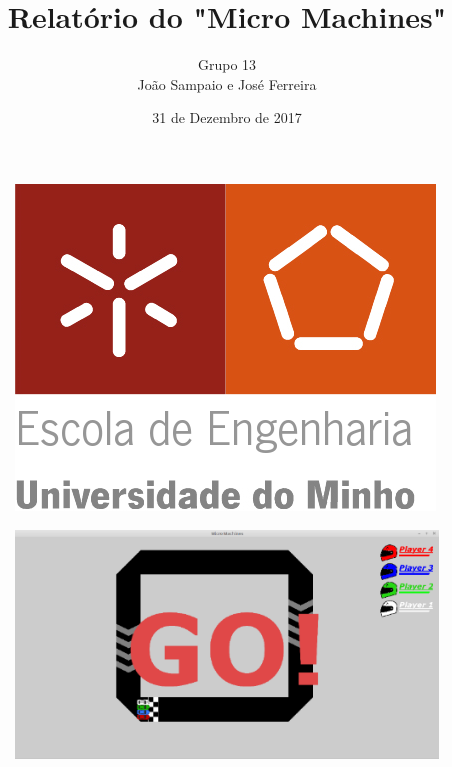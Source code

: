 \documentclass[a4paper]{report} %
\begin{document}
\begin{figure}[t]
    
    \centering
    \flushleft\includegraphics[scale = 0.2]{Imagens/um.png}

\end{figure}

\title {\huge Relatório do "Micro Machines"}
\author{Grupo 13
\\
João Sampaio e José Ferreira}

\date{31 de Dezembro de 2017}

\begin{figure}[b]
    
    \centering
    \includegraphics[scale= 0.75]{Imagens/capa.png}

\end{figure}

\pagestyle{fancy} %
 
\lhead{\rightmark} %
 
\chead{} %
 
\end{document}
